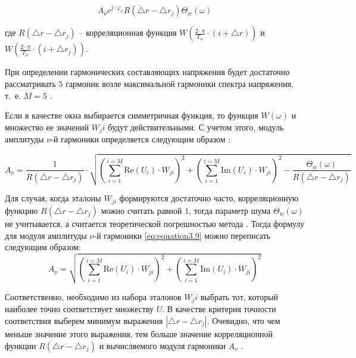 $$
 A_{\nu} e^{j \cdot \varphi_\nu} R (\bigtriangleup r - \bigtriangleup r_j) \Theta_w(\omega)
$$

где $R (\bigtriangleup r - \bigtriangleup r_j)$ – корреляционная функция $W\left( {\frac{2 \cdot \pi}{T_w} \cdot (i + \bigtriangleup r) }\right)$  и $W\left( {\frac{2 \cdot \pi}{T_w} \cdot (i + \bigtriangleup r_j) }\right)$. 

При определении гармонических составляющих напряжения будет достаточно рассматривать $5$ гармоник возле максимальной гармоники спектра напряжения, т.~е. $M = 5$ \cite{Increase_Accuracy_Yelizarov2014}.
 
Если в качестве окна выбирается симметричная функция, то функция $W(\omega)$  и множество ее значений $W_ji$  будут действительными. С учетом этого, модуль амплитуды  $\nu$-й гармоники определяется следующим образом \cite{Increase_Accuracy_Yelizarov2014}:

\begin{equation}
	\label{eq:equation3.9}
	A_{\nu} = \frac{1}{R(\bigtriangleup r - \bigtriangleup r_j)} \cdot \sqrt{\left({\displaystyle\sum_{i=1}^{i=M}\mathrm{Re}(U_i) \cdot W_{ji}} \right)^2 + \left({\displaystyle\sum_{i=1}^{i=M}\mathrm{Im}(U_i) \cdot W_{ji}} \right)^2 - \frac{\Theta_w(\omega)}{R(\bigtriangleup r - \bigtriangleup r_j)}}
\end{equation}

Для случая, когда эталоны $W_{ji}$ формируются достаточно часто, корреляционную функцию $R(\bigtriangleup r - \bigtriangleup r_j) $  можно считать равной $1$, тогда параметр шума $\Theta_w(\omega)$ не учитывается, а считается теоретической погрешностью метода \cite{Increase_Accuracy_Yelizarov2014}. Тогда формулу для модуля амплитуды  $\nu$-й гармоники \ref{eq:equation3.9} можно переписать следующим образом:
\begin{equation}
	\label{eq:equation3.10}
	A_{\nu} =  \sqrt{\left({\displaystyle\sum_{i=1}^{i=M}\mathrm{Re}(U_i) \cdot W_{ji}} \right)^2 + \left({\displaystyle\sum_{i=1}^{i=M}\mathrm{Im}(U_i) \cdot W_{ji}} \right)^2}
\end{equation}

Соответственно, необходимо из набора  эталонов $W_ji$ выбрать тот, который наиболее точно соответствует множеству $U$. В качестве критерия точности соответствия выберем минимум выражения $ \left|{\bigtriangleup r - \bigtriangleup r_j}\right| $. Очевидно, что чем меньше значение этого выражения, тем больше значение корреляционной функции $R(\bigtriangleup r - \bigtriangleup r_j)$ и вычисляемого модуля гармоники $A_\nu$ \cite{Increase_Accuracy_Yelizarov2014}. 

